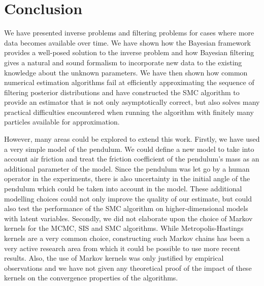\section{Conclusion}

We have presented inverse problems and filtering problems for cases where more data becomes available over time. We have shown how the Bayesian framework provides a well-posed solution to the inverse problem and how Bayesian filtering gives a natural and sound formalism to incorporate new data to the existing knowledge about the unknown parameters. We have then shown how common numerical estimation algorithms fail at efficiently approximating the sequence of filtering posterior distributions and have constructed the SMC algorithm to provide an estimator that is not only asymptotically correct, but also solves many practical difficulties encountered when running the algorithm with finitely many particles available for approximation.

However, many areas could be explored to extend this work. Firstly, we have used a very simple model of the pendulum. We could define a new model to take into account air friction and treat the friction coefficient of the pendulum's mass as an additional parameter of the model. Since the pendulum was let go by a human operator in the experiments, there is also uncertainty in the initial angle of the pendulum which could be taken into account in the model. These additional modelling choices could not only improve the quality of our estimate, but could also test the performance of the SMC algorithm on higher-dimensional models with latent variables. Secondly, we did not elaborate upon the choice of Markov kernels for the MCMC, SIS and SMC algorithms. While Metropolis-Hastings kernels are a very common choice, constructing such Markov chains has been a very active research area from which it could be possible to use more recent results. Also, the use of Markov kernels was only justified by empirical observations and we have not given any theoretical proof of the impact of these kernels on the convergence properties of the algorithms.

